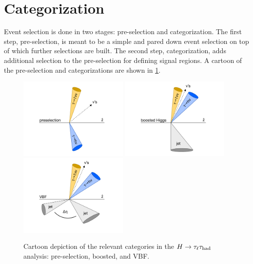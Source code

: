 \section{Categorization}
\label{sec:strategy-categorization}

Event selection is done in two stages: pre-selection and categorization. The first step, pre-selection, is meant to be a simple and pared down event selection on top of which further selections are built. The second step, categorization, adds additional selection to the pre-selection for defining signal regions. A cartoon of the pre-selection and categorizations are shown in \cref{fig:strategy-category-cartoons}.

\begin{figure}[tp]
  \centering
  \includegraphics[width=0.48\textwidth]{figures/category-cartoons/presel}
  \includegraphics[width=0.48\textwidth]{figures/category-cartoons/boost}
  \includegraphics[width=0.48\textwidth]{figures/category-cartoons/vbf}
  \caption{Cartoon depiction of the relevant categories in the $H\rightarrow\tau_\ell\tau_\text{had}$ analysis: pre-selection, boosted, and VBF.}
  \label{fig:strategy-category-cartoons}
\end{figure}

